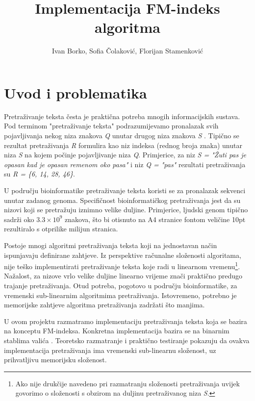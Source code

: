 \documentclass[times, utf8, seminar, numeric]{fer}
\title{Implementacija FM-indeks algoritma}
\author{Ivan Borko, Sofia Čolaković, Florijan Stamenković}
\begin{document}
\maketitle

\tableofcontents

\chapter{Uvod i problematika}

Pretraživanje teksta česta je praktična potreba mnogih informacijskih sustava.
Pod terminom "pretraživanje teksta" podrazumijevamo pronalazak svih pojavljivanja
nekog niza znakova \textit{Q}  unutar drugog niza znakova \textit{S} .
Tipično se rezultat pretraživanja \textit{R}
formulira kao niz indeksa (rednog broja znaka) unutar niza \textit{S} na kojem počinje pojavljivanje
niza \textit{Q}. Primjerice, za niz \textit{S = "Žuti pas je opasan kad je opasan remenom oko pasa"}
i niz \textit{Q = "pas"} rezultati
pretraživanja su \textit{R = \{6, 14, 28, 46\}}.

U području bioinformatike pretraživanje teksta koristi se za pronalazak
sekvenci unutar zadanog genoma. Specifičnost
bioinformatičkog pretraživanja jest da su nizovi koji se pretražuju iznimno velike duljine.
Primjerice, ljudski genom tipično sadrži oko $3.3 \times 10^9$ znakova, što bi otisnuto na
A4 stranice fontom veličine 10pt rezultiralo s otprilike milijun stranica.

Postoje mnogi algoritmi pretraživanja teksta
koji na jednostavan način ispunjavaju definirane zahtjeve.
Iz perspektive računalne složenosti algoritama, nije teško implementirati pretraživanje
teksta koje radi u linearnom vremenu\footnote{Ako nije drukčije navedeno pri razmatranju složenosti pretraživanja
uvijek govorimo o složenosti s obzirom na duljinu pretraživanog niza \textit{S}.}.
Nažalost, za nizove vrlo velike duljine linearno vrijeme
znači praktično predugo trajanje pretraživanja. Otud potreba, pogotovo u području bioinformatike,
za vremenski sub-linearnim algoritmima pretraživanja. Istovremeno, potrebno je memorijske
zahtjeve algoritma pretraživanja zadržati što manjima.

U ovom projektu razmatramo implementaciju pretraživanja teksta koja se bazira na konceptu
FM-indeksa. Konkretna implementacija bazira se na binarnim stablima valića .
Teoretsko razmatranje i praktično testiranje pokazuju da ovakva implementacija pretraživanja
ima vremenski sub-linearnu složenost, uz prihvatljivu memorijsku složenost.
\end{document}
